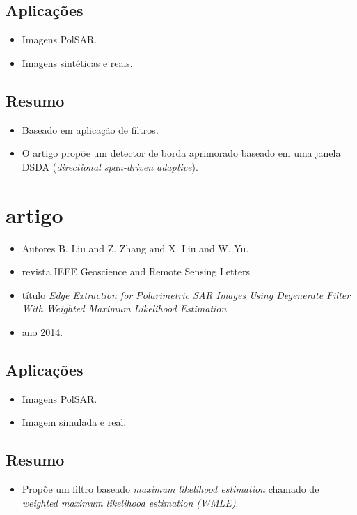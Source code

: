 \documentclass{article}
\begin{document}
\subsection{Aplicações}
\begin{itemize}
\item Imagens PolSAR.
\item Imagens sintéticas e reais.
\end{itemize}
\subsection{Resumo}
\begin{itemize}
\item Baseado em aplicação de filtros.
\item O artigo propõe um detector de borda aprimorado baseado em uma janela DSDA (\textit{directional span-driven adaptive}).
\end{itemize}

\section{artigo \cite{lzly}}
\begin{itemize}
\item Autores B. {Liu} and Z. {Zhang} and X. {Liu} and W. {Yu}.
\item revista IEEE Geoscience and Remote Sensing Letters
\item título \textit{Edge Extraction for Polarimetric SAR Images Using Degenerate Filter With Weighted Maximum Likelihood Estimation}
\item ano 2014.
\end{itemize}
\subsection{Aplicações}
\begin{itemize}
\item Imagens PolSAR.
\item Imagem simulada e real.
\end{itemize}
\subsection{Resumo}
\begin{itemize}
\item Propõe um filtro baseado \textit{maximum likelihood estimation} chamado de \textit{weighted maximum likelihood estimation (WMLE)}.
\end{itemize}
\end{document}
